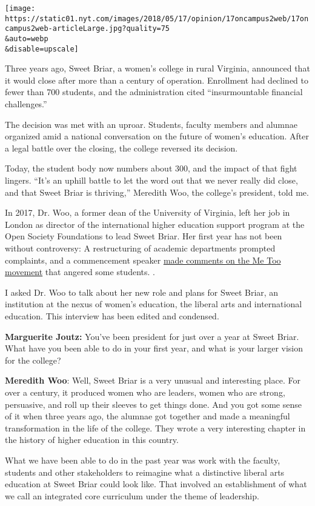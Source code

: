 \texttt{[image: https://static01.nyt.com/images/2018/05/17/opinion/17oncampus2web/17oncampus2web-articleLarge.jpg?quality=75\\\&auto=webp\\\&disable=upscale]}

Three years ago, Sweet Briar, a women's college in rural Virginia,
announced that it would close after more than a century of operation.
Enrollment had declined to fewer than 700 students, and the
administration cited ``insurmountable financial challenges.''

The decision was met with an uproar. Students, faculty members and
alumnae organized amid a national conversation on the future of women's
education. After a legal battle over the closing, the college reversed
its decision.

Today, the student body now numbers about 300, and the impact of that
fight lingers. ``It's an uphill battle to let the word out that we never
really did close, and that Sweet Briar is thriving,'' Meredith Woo, the
college's president, told me.

In 2017, Dr. Woo, a former dean of the University of Virginia, left her
job in London as director of the international higher education support
program at the Open Society Foundations to lead Sweet Briar. Her first
year has not been without controversy: A restructuring of academic
departments prompted complaints, and a commencement speaker
\href{https://www.insidehighered.com/news/2018/05/14/anger-sweet-briar-over-commencement-speech}{made
comments on the Me Too movement} that angered some students. .

I asked Dr. Woo to talk about her new role and plans for Sweet Briar, an
institution at the nexus of women's education, the liberal arts and
international education. This interview has been edited and condensed.

\textbf{Marguerite Joutz:} You've been president for just over a year at
Sweet Briar. What have you been able to do in your first year, and what
is your larger vision for the college?

\textbf{Meredith Woo}: Well, Sweet Briar is a very unusual and
interesting place. For over a century, it produced women who are
leaders, women who are strong, persuasive, and roll up their sleeves to
get things done. And you got some sense of it when three years ago, the
alumnae got together and made a meaningful transformation in the life of
the college. They wrote a very interesting chapter in the history of
higher education in this country.

What we have been able to do in the past year was work with the faculty,
students and other stakeholders to reimagine what a distinctive liberal
arts education at Sweet Briar could look like. That involved an
establishment of what we call an integrated core curriculum under the
theme of leadership.

